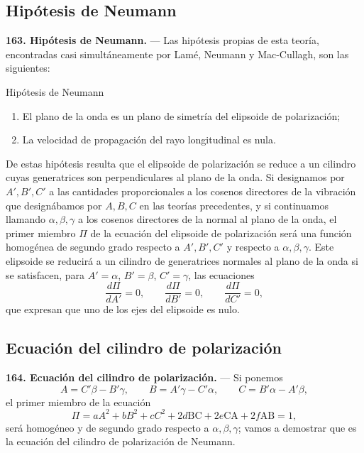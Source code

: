 \subsection{Hipótesis de Neumann}

\noindent\textbf{163. Hipótesis de Neumann.} — Las hipótesis propias de
esta teoría, encontradas casi simultáneamente por Lamé, Neumann y
Mac-Cullagh, son las siguientes:

\begin{enunciado}{Hipótesis de Neumann}
\begin{enumerate}
\item[1.\textsuperscript{o}] El plano de la onda es un plano de simetría
del elipsoide de polarización;
\item[2.\textsuperscript{o}] La velocidad de propagación del rayo
longitudinal es nula.
\end{enumerate}
\end{enunciado}

De estas hipótesis resulta que el elipsoide de polarización se reduce a un
cilindro cuyas generatrices son perpendiculares al plano de la onda. Si
designamos por $A',B',C'$ a las cantidades proporcionales a los cosenos
directores de la vibración que designábamos por $A,B,C$ en las teorías
precedentes, y si continuamos llamando $\alpha,\beta,\gamma$ a los cosenos
directores de la normal al plano de la onda, el primer miembro $\Pi$ de la
ecuación del elipsoide de polarización será una función homogénea de
segundo grado respecto a $A',B',C'$ y respecto a $\alpha,\beta,\gamma$.
Este elipsoide se reducirá a un cilindro de generatrices normales al plano
de la onda si se satisfacen, para $A'=\alpha$, $B'=\beta$, $C'=\gamma$, las
ecuaciones
\begin{equation}
\frac{d\Pi}{dA'}=0,\qquad \frac{d\Pi}{dB'}=0,\qquad \frac{d\Pi}{dC'}=0,
\tag{1}
\end{equation}
que expresan que uno de los ejes del elipsoide es nulo.

\subsection{Ecuación del cilindro de polarización}

\noindent\textbf{164. Ecuación del cilindro de polarización.} — Si
ponemos
\begin{equation}
A=C'\beta-B'\gamma,\qquad B=A'\gamma-C'\alpha,\qquad C=B'\alpha-A'\beta,
\tag{2}
\end{equation}
el primer miembro de la ecuación
\begin{equation}
\Pi=aA^2+bB^2+cC^2+2d\mathrm{BC}+2e\mathrm{CA}+2f\mathrm{AB}=1,
\tag{3}
\end{equation}
será homogéneo y de segundo grado respecto a $\alpha,\beta,\gamma$; vamos a
demostrar que es la ecuación del cilindro de polarización de Neumann.

